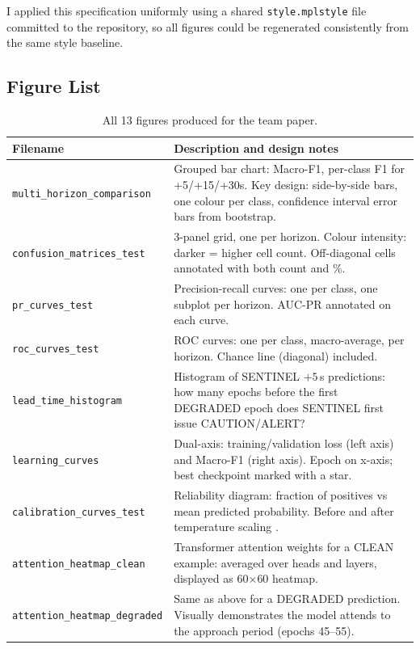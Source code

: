 \documentclass[12pt,a4paper]{article}
\newcommand{\code}[1]{\texttt{#1}}
\begin{document}
I applied this specification uniformly using a shared \code{style.mplstyle} file
committed to the repository, so all figures could be regenerated consistently from
the same style baseline.

\subsection{Figure List}

\begin{longtable}{lp{8cm}}
  \caption{All 13 figures produced for the team paper.} \\
  \toprule
  \textbf{Filename} & \textbf{Description and design notes} \\
  \midrule
  \endhead
  \code{multi\_horizon\_comparison} &
    Grouped bar chart: Macro-F1, per-class F1 for +5/+15/+30s.
    Key design: side-by-side bars, one colour per class, confidence interval
    error bars from bootstrap. \\
  \code{confusion\_matrices\_test} &
    3-panel grid, one per horizon. Colour intensity: darker = higher cell count.
    Off-diagonal cells annotated with both count and \%. \\
  \code{pr\_curves\_test} &
    Precision-recall curves: one per class, one subplot per horizon.
    AUC-PR annotated on each curve. \\
  \code{roc\_curves\_test} &
    ROC curves: one per class, macro-average, per horizon.
    Chance line (diagonal) included. \\
  \code{lead\_time\_histogram} &
    Histogram of SENTINEL $+5$\,s predictions: how many epochs before the first
    DEGRADED epoch does SENTINEL first issue CAUTION/ALERT? \\
  \code{learning\_curves} &
    Dual-axis: training/validation loss (left axis) and Macro-F1 (right axis).
    Epoch on x-axis; best checkpoint marked with a star. \\
  \code{calibration\_curves\_test} &
    Reliability diagram: fraction of positives vs mean predicted probability.
    Before and after temperature scaling \cite{guo2017calibration}. \\
  \code{attention\_heatmap\_clean} &
    Transformer attention weights for a CLEAN example: averaged over heads and layers,
    displayed as 60$\times$60 heatmap. \\
  \code{attention\_heatmap\_degraded} &
    Same as above for a DEGRADED prediction.
    Visually demonstrates the model attends to the approach period (epochs 45--55). \\

\end{longtable}
\end{document}
